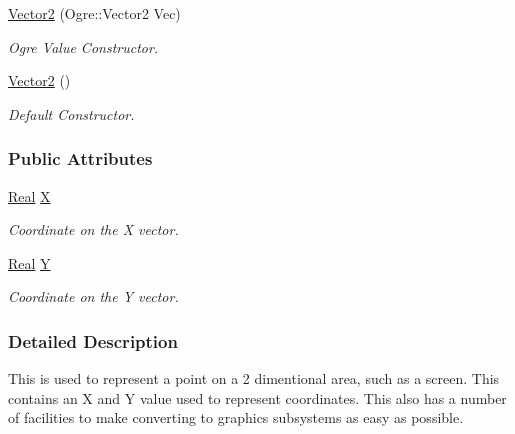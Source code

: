 \begin{DoxyCompactItemize}
\hyperlink{classMezzanine_1_1Vector2_afef55035d60801454d4b207cf3c2aeaf}{Vector2} (Ogre::Vector2 Vec)
\begin{DoxyCompactList}\small\item\em Ogre Value Constructor. \item\end{DoxyCompactList}\item 
\hyperlink{classMezzanine_1_1Vector2_a28774bd4b7bcbb09bfd20cf7c30213a2}{Vector2} ()
\begin{DoxyCompactList}\small\item\em Default Constructor. \item\end{DoxyCompactList}\end{DoxyCompactItemize}
\subsubsection*{Public Attributes}
\begin{DoxyCompactItemize}
\item 
\hypertarget{classMezzanine_1_1Vector2_a204bb23ce90f944f342fe86203f539d1}{
\hyperlink{namespaceMezzanine_a726731b1a7df72bf3583e4a97282c6f6}{Real} \hyperlink{classMezzanine_1_1Vector2_a204bb23ce90f944f342fe86203f539d1}{X}}
\label{classMezzanine_1_1Vector2_a204bb23ce90f944f342fe86203f539d1}

\begin{DoxyCompactList}\small\item\em Coordinate on the X vector. \item\end{DoxyCompactList}\item 
\hypertarget{classMezzanine_1_1Vector2_aa189e2585580d3f82b29584844fad0ad}{
\hyperlink{namespaceMezzanine_a726731b1a7df72bf3583e4a97282c6f6}{Real} \hyperlink{classMezzanine_1_1Vector2_aa189e2585580d3f82b29584844fad0ad}{Y}}
\label{classMezzanine_1_1Vector2_aa189e2585580d3f82b29584844fad0ad}

\begin{DoxyCompactList}\small\item\em Coordinate on the Y vector. \item\end{DoxyCompactList}\end{DoxyCompactItemize}


\subsubsection{Detailed Description}
This is used to represent a point on a 2 dimentional area, such as a screen. This contains an X and Y value used to represent coordinates. This also has a number of facilities to make converting to graphics subsystems as easy as possible. 

